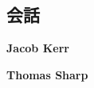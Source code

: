 \documentclass[12pt]{book}
\begin{document}
\begin{CJK}{UTF8}{min}

\newcommand{\akun}{\vspace{.5ex}\textbf{アくん}\hspace{1ex}}
\newcommand{\bkun}{\vspace{.5ex}\textbf{イくん}\hspace{1ex}}

\chapter*{\flushright 会話}
\begin{flushright}
\textbf{Jacob Kerr}
\vspace{1ex}

\textbf{Thomas Sharp}
\end{flushright}




\end{CJK}
\end{document}
